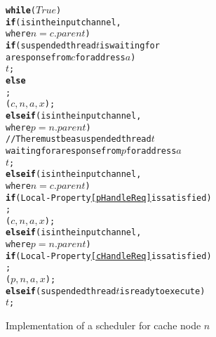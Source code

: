 \newcommand{\lWhile}{\textbf{while}}
\newcommand{\lIf}{\textbf{if}}
\newcommand{\lElsIf}{\textbf{else if}}
\newcommand{\lElse}{\textbf{else}}


\begin{figure}
\small
\begin{boxedminipage}{\linewidth}
\begin{alltt}
\normalfont
\lWhile{} (\(True\)) \bopen
      \lIf ( is in the input channel,
            where \(n = c.parent\)) \bopen
            \lIf (suspended thread \(t\) is waiting for 
                 a response from \(c\) for address \(a\)) \bopen
                   \resume{} \(t\);
            \bclose \lElse \bopen
                   \receive{} ;
                   \start{} \dRespL(\(c, n, a, x\));
            \bclose
      \bclose \lElsIf ( is in the input channel,
            where \(p = n.parent\)) \bopen
                   // There must be a suspended thread \(t\)
                   waiting for a response from \(p\) for address \(a\)
                   \resume{} \(t\);
            \bclose
      \bclose \lElsIf ( is in the input channel,
                     where \(n = c.parent\)) \bopen
             \lIf (Local-Property \ref{pHandleReq} is satisfied) \bopen
                   \receive{} ;
                   \start{} \uReq(\(c, n, a, x\));
             \bclose
      \bclose \lElsIf ( is in the input channel,
                  where \(p = n.parent\)) \bopen
             \lIf (Local-Property \ref{cHandleReq} is satisfied) \bopen
                   \receive{} ;
                   \start{} \dReq(\(p, n, a, x\));
             \bclose
      \bclose \lElsIf (suspended thread \(t\) is ready to execute) 
             \resume{} \(t\);
\bclose
\end{alltt}
\end{boxedminipage}
\caption{Implementation of a scheduler for cache node $n$}
\label{scheduler}
\end{figure}
